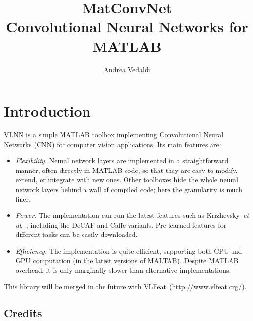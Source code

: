 \documentclass[12pt]{article}
\newcommand{\vlnn}{\textsf{VLNN}\xspace}
\begin{document}
\title{MatConvNet \\
Convolutional Neural Networks for MATLAB}
\author{Andrea Vedaldi}
\maketitle{}

\section{Introduction}

\vlnn is a simple MATLAB toolbox implementing Convolutional Neural Networks (CNN) for computer vision applications. Its main features are:
\begin{itemize}
\item \emph{Flexibility.} Neural network layers are implemented in a straightforward manner, often directly in MATLAB code, so that they are easy to modify, extend, or integrate with new ones. Other toolboxes hide the whole neural network layers behind a wall of compiled code; here the granularity is much finer.
\item \emph{Power.} The implementation can run the latest features such as Krizhevsky~\textit{et al.}~\cite{krizhevsky12imagenet}, including the DeCAF and Caffe variants. Pre-learned features for different tasks can be easily downloaded.
\item \emph{Efficiency.} The implementation is quite efficient, supporting both CPU and GPU computation (in the latest versions of MALTAB). Despite MATLAB overhead, it is only marginally slower than alternative implementations.
\end{itemize}
This library will be merged in the future with VLFeat~(\url{http://www.vlfeat.org/}).

\subsection{Credits}

\section{}
\end{document}

